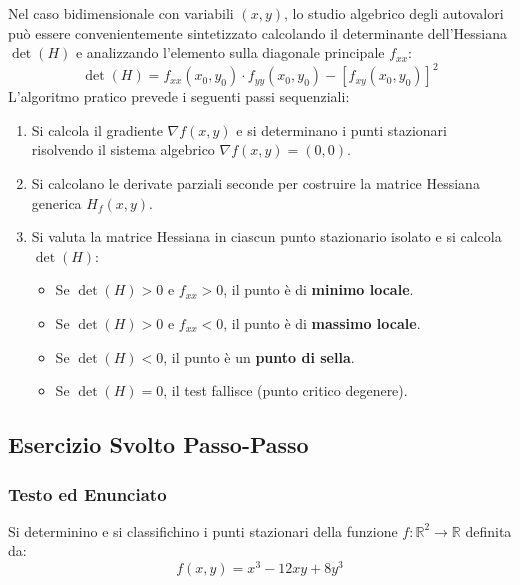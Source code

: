 Nel caso bidimensionale con variabili $(x,y)$, lo studio algebrico degli autovalori può essere convenientemente sintetizzato calcolando il determinante dell'Hessiana $\det(H)$ e analizzando l'elemento sulla diagonale principale $f_{xx}$:
\[ \det(H) = f_{xx}(x_0,y_0) \cdot f_{yy}(x_0,y_0) - \left[f_{xy}(x_0,y_0)\right]^2 \]
L'algoritmo pratico prevede i seguenti passi sequenziali:
\begin{enumerate}
    \item Si calcola il gradiente $\nabla f(x,y)$ e si determinano i punti stazionari risolvendo il sistema algebrico $\nabla f(x,y) = (0,0)$.
    \item Si calcolano le derivate parziali seconde per costruire la matrice Hessiana generica $H_f(x,y)$.
    \item Si valuta la matrice Hessiana in ciascun punto stazionario isolato e si calcola $\det(H)$:
    \begin{itemize}
        \item Se $\det(H) > 0$ e $f_{xx} > 0$, il punto è di \textbf{minimo locale}.
        \item Se $\det(H) > 0$ e $f_{xx} < 0$, il punto è di \textbf{massimo locale}.
        \item Se $\det(H) < 0$, il punto è un \textbf{punto di sella}.
        \item Se $\det(H) = 0$, il test fallisce (punto critico degenere).
    \end{itemize}
\end{enumerate}

\subsection{Esercizio Svolto Passo-Passo}

\subsubsection{Testo ed Enunciato}
Si determinino e si classifichino i punti stazionari della funzione $f: \mathbb{R}^2 \to \mathbb{R}$ definita da:
\[ f(x,y) = x^3 - 12xy + 8y^3 \]

